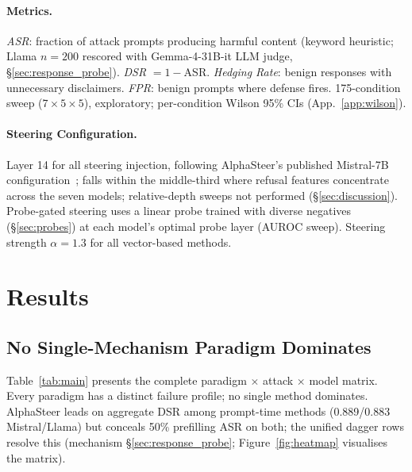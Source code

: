 \documentclass{article}
\begin{document}
\paragraph{Metrics.} \emph{ASR}: fraction of attack prompts producing harmful content (keyword heuristic; Llama $n=200$ rescored with Gemma-4-31B-it LLM judge, \S\ref{sec:response_probe}). \emph{DSR} $= 1-$ASR. \emph{Hedging Rate}: benign responses with unnecessary disclaimers. \emph{FPR}: benign prompts where defense fires. 175-condition sweep ($7 \times 5 \times 5$), exploratory; per-condition Wilson 95\% CIs (App.~\ref{app:wilson}).

\paragraph{Steering Configuration.} Layer 14 for all steering injection, following AlphaSteer's published Mistral-7B configuration~\citep{alphasteer2026}; falls within the middle-third where refusal features concentrate across the seven models; relative-depth sweeps not performed (\S\ref{sec:discussion}). Probe-gated steering uses a linear probe trained with diverse negatives (\S\ref{sec:probes}) at each model's optimal probe layer (AUROC sweep). Steering strength $\alpha = 1.3$ for all vector-based methods.

\section{Results}
\label{sec:results}

\subsection{No Single-Mechanism Paradigm Dominates}
\label{sec:main_results}

Table~\ref{tab:main} presents the complete paradigm $\times$ attack $\times$ model matrix. Every paradigm has a distinct failure profile; no single method dominates. AlphaSteer leads on aggregate DSR among prompt-time methods (0.889/0.883 Mistral/Llama) but conceals 50\% prefilling ASR on both; the unified dagger rows resolve this (mechanism \S\ref{sec:response_probe}; Figure~\ref{fig:heatmap} visualises the matrix).
\end{document}
